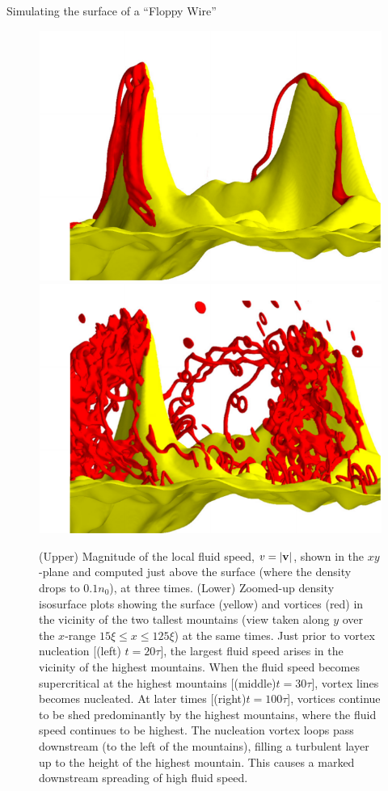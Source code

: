 \begin{chapter}{\label{cha:afm}Simulating the surface of a ``Floppy Wire''}
\begin{figure}
{\begin{minipage}{1.1\textwidth}
  \includegraphics[width=0.3\linewidth]{./afm/afm-sub-3101}
  \includegraphics[width=0.3\linewidth]{./afm/afm-sub-10101}
  \end{minipage}
  }
  \caption{(Upper) Magnitude of the local fluid speed, $v=|{\bf v}|$, shown in the $xy$-plane and computed just above the surface (where the
density drops to $0.1 n_0$), at three times.  (Lower) Zoomed-up density isosurface plots showing the surface (yellow) and vortices (red) in the vicinity of the two tallest mountains (view taken along $y$ over the $x$-range $15 \xi \leq x \leq 125 \xi$) at the same times.  Just prior to vortex nucleation [(left) $t=20 \tau$], the largest fluid speed arises in the vicinity of the highest mountains.  When the fluid speed becomes supercritical at the highest mountains [(middle)$t=30 \tau$], vortex lines becomes nucleated.  At later times [(right)$t=100 \tau$], vortices continue to be shed predominantly by the highest mountains, where the fluid speed continues to be highest.  
The nucleation vortex loops pass downstream (to the left of the mountains), filling a turbulent layer up to the height of the highest mountain.  This causes a marked downstream spreading of high fluid speed. }
 \end{figure} 


\end{chapter}
